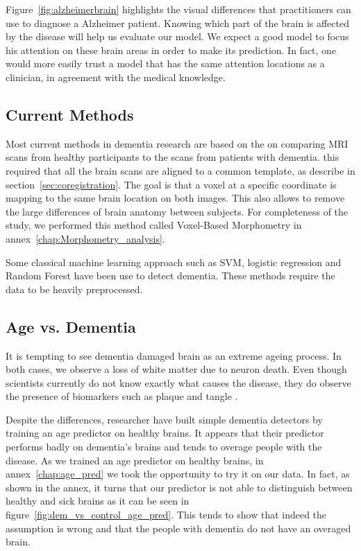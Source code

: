 Figure~\ref{fig:alzheimerbrain} highlights the visual differences that practitioners can use to diagnose a Alzheimer patient. Knowing which part of the brain is affected by the disease will help us evaluate our model. We expect a good model to focus his attention on these brain areas in order to make its prediction. In fact, one would more easily trust a model that has the same attention locations as a clinician, in agreement with the medical knowledge.

\subsection{Current Methods}
Most current methods in dementia research are based on the on comparing MRI scans from healthy participants to the scans from patients with dementia. this required that all the brain scans are aligned to a common template, as describe in section~\ref{sec:coregistration}. The goal is that a voxel at a specific coordinate is mapping to the same brain location on both images. This also allows to remove the large differences of brain anatomy between subjects. For completeness of the study, we performed this method called Voxel-Based Morphometry\cite{voxel_based_morphometry_ASHBURNER2000805} in annex~\ref{chap:Morphometry_analysis}.

Some classical machine learning\cite{classical_ml_methods_SAMPERGONZALEZ2018504} approach such as SVM\cite{svm_article}, logistic regression and Random Forest\cite{random_forest_10.1023/A:1010933404324} have been use to detect dementia. These methods require the data to be heavily preprocessed.


\subsection{Age vs. Dementia}

It is tempting to see dementia damaged brain as an extreme ageing process. In both cases, we observe a loss of white matter due to neuron death. Even though scientists currently do not know exactly what causes the disease, they do observe the presence of biomarkers such as plaque and tangle \cite{alzheimer_past_present_future}.

Despite the differences, researcher\cite{brain_age_10.3389/fneur.2019.00789} have built simple dementia detectors by training an age predictor on healthy brains. It appears that their predictor performs badly on dementia's brains and tends to overage people with the disease. As we trained an age predictor on healthy brains, in annex~\ref{chap:age_pred} we took the opportunity to try it on our data. In fact, as shown in the annex, it turns that our predictor is not able to distinguish between healthy and sick brains as it can be seen in figure~\ref{fig:dem_vs_control_age_pred}. This tends to show that indeed the assumption is wrong and that the people with dementia do not have an overaged brain.

